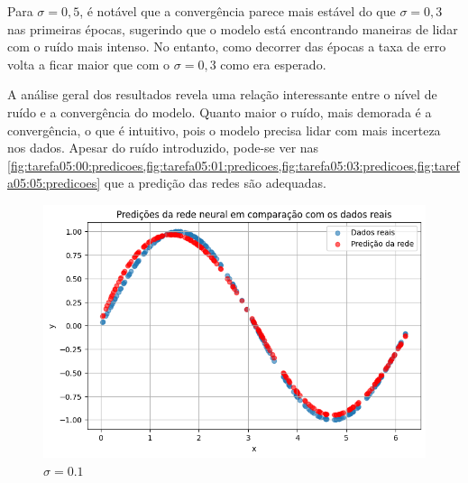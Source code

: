 Para $\sigma=0,5$, é notável que a convergência parece 
mais estável do que $\sigma=0,3$ nas primeiras épocas, sugerindo que o modelo 
está encontrando maneiras de lidar com o ruído mais intenso. No entanto, como 
decorrer 
das épocas a taxa de erro volta a ficar maior que com o $\sigma=0,3$ como era 
esperado. 

A análise geral dos resultados revela uma relação interessante entre o nível de 
ruído e a convergência do modelo. Quanto maior o ruído, mais demorada é a 
convergência, o que é intuitivo, pois o modelo precisa lidar com mais incerteza 
nos dados. 
Apesar do ruído introduzido, pode-se ver nas 
\cref{fig:tarefa05:00:predicoes,fig:tarefa05:01:predicoes,fig:tarefa05:03:predicoes,fig:tarefa05:05:predicoes}
 que a predição das redes 
são adequadas.

\begin{figure}[htb]
	\centering
	\begin{minipage}{0.45\textwidth}
		\centering
		\caption{$\sigma=0.0$}\label{fig:tarefa05:00:predicoes}
		
		\includegraphics[width=\textwidth]{./0803_imgs/0365_tarefa05/png-241110-192904307-9336339325602212821.png}
	\end{minipage}
	\hfill
	\begin{minipage}{0.45\textwidth}
		\centering
		\caption{$\sigma=0.1$}\label{fig:tarefa05:01:predicoes}
		

\end{minipage}
\end{figure}
